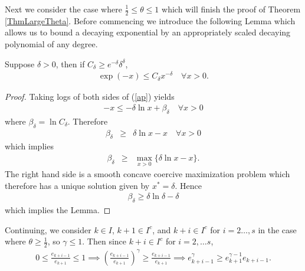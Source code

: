 \noindent
Next we consider the case where $\frac{1}{2}\leq\theta\leq 1$ which will finish the proof of Theorem \ref{ThmLargeTheta}. Before commencing we introduce the following Lemma which allows us to bound a decaying exponential by an appropriately scaled decaying polynomial of any degree.
\begin{lemma}\label{expToPoly}
Suppose $\delta>0$, then if $C_\delta\geq e^{-\delta}\delta^\delta$,
\begin{eqnarray}\label{ap}
\exp(-x)\leq C_\delta x^{-\delta}\quad\forall x>0.
\end{eqnarray}

\end{lemma}
\begin{proof}
Taking logs of both sides of (\ref{ap}) yields
\begin{eqnarray*}
-x\leq -\delta\ln x + \beta_\delta\quad\forall x>0
\end{eqnarray*}
where $\beta_\delta=\ln C_\delta$. Therefore
\begin{eqnarray*}
\beta_\delta
&\geq& \delta\ln x - x\quad\forall x>0
\end{eqnarray*}
which implies
\begin{eqnarray*}
\beta_\delta
&\geq& 
\max_{x>0}\{\delta\ln x - x\}.
\end{eqnarray*}
The right hand side is a smooth concave coercive maximization problem which therefore has a unique solution given by $x^*=\delta$. Hence
\begin{eqnarray*}
\beta_{\delta}\geq \delta\ln\delta - \delta
\end{eqnarray*}
which implies the Lemma. 
\end{proof}

Continuing, we consider $k\in I$, $k+1\in I^c$, and $k+i\in I^c$ for $i=2\ldots,s$ in the case where $\theta\geq\frac{1}{2}$, so $\gamma\leq 1$. Then since $k+i\in I^c$ for $i=2,\ldots s$,
\begin{eqnarray*}
0\leq\frac{e_{k+i-1}}{e_{k+1}}\leq 1\implies \left(\frac{e_{k+i-1}}{e_{k+1}}\right)^{\gamma}\geq \frac{e_{k+i-1}}{e_{k+1}}
\implies
e_{k+i-1}^\gamma \geq e_{k+1}^{\gamma-1}e_{k+i-1}.
\end{eqnarray*} 


